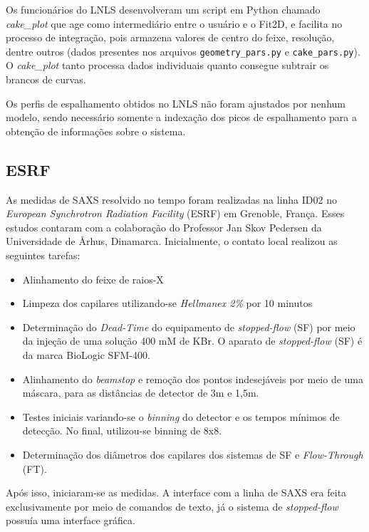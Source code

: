 			Os funcionários do LNLS desenvolveram um script em Python chamado \emph{cake\_plot} que age como intermediário entre o usuário e o Fit2D, e facilita no processo de integração, pois armazena valores de centro do feixe, resolução, dentre outros (dados presentes nos arquivos \texttt{geometry\_pars.py} e \texttt{cake\_pars.py}). O \emph{cake\_plot} tanto processa dados individuais quanto consegue subtrair os brancos de curvas.
			
			Os perfis de espalhamento obtidos no LNLS não foram ajustados por nenhum modelo, sendo necessário somente a indexação dos picos de espalhamento para a obtenção de informações sobre o sistema.		
			
			\subsection{ESRF}  
			As medidas de SAXS resolvido no tempo foram realizadas na linha ID02 no \emph{European Synchrotron Radiation Facility} (ESRF) em Grenoble, França. Esses estudos contaram com a colaboração do Professor Jan Skov Pedersen da Universidade de \AA rhus, Dinamarca. Inicialmente, o contato local realizou as seguintes tarefas:
			
			\begin{itemize}[noitemsep]
				\item Alinhamento do feixe de raios-X
				\item Limpeza dos capilares utilizando-se \emph{Hellmanex 2\%} por 10 minutos
				\item Determinação do \emph{Dead-Time} do equipamento de \emph{stopped-flow} (SF) por meio da injeção de uma solução 400 mM de KBr. O aparato de \emph{stopped-flow} (SF) é da marca BioLogic SFM-400.
				\item Alinhamento do \emph{beamstop} e remoção dos pontos indesejáveis por meio de uma máscara, para as distâncias de detector de 3m e 1,5m.
				\item Testes iniciais variando-se o \emph{binning} do detector e os tempos mínimos de detecção. No final, utilizou-se binning de 8x8.
				\item Determinação dos diâmetros dos capilares dos sistemas de SF e \emph{Flow-Through} (FT).
			\end{itemize}
			
			Após isso, iniciaram-se as medidas. A interface com a linha de SAXS era feita exclusivamente por meio de comandos de texto, já o sistema de \emph{stopped-flow} possuía uma interface gráfica.
			
